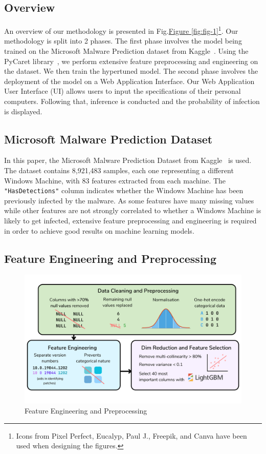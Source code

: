 \documentclass[pdflatex,sn-basic,Numbered]{sn-jnl}%
\theoremstyle{thmstyleone}%
\theoremstyle{thmstyletwo}%
\theoremstyle{thmstylethree}%
\newcommand{\reffig}[1]{\hyperref[#1]{Figure \ref*{#1}}}
\begin{document}
\subsection{Overview}\label{subsec:overview}
An overview of our methodology is presented in Fig.\reffig{fig:fig-1}\footnote[1]{Icons from Pixel Perfect, Eucalyp, Paul J., Freepik, and Canva have been used when designing the figures.}.
Our methodology is split into 2 phases.
The first phase involves the model being trained on the Microsoft Malware Prediction dataset from Kaggle~\cite{microsoft-malware-prediction}.
Using the PyCaret library~\cite{pycaret}, we perform extensive feature preprocessing and engineering on the dataset.
We then train the hypertuned model.
The second phase involves the deployment of the model on a Web Application Interface.
Our Web Application User Interface (UI) allows users to input the specifications of their personal computers.
Following that, inference is conducted and the probability of infection is displayed.

\subsection{Microsoft Malware Prediction Dataset}\label{subsec:microsoft-malware-prediction-dataset}
In this paper, the Microsoft Malware Prediction Dataset from Kaggle~\cite{microsoft-malware-prediction} is used.
The dataset contains 8,921,483 samples, each one representing a different Windows Machine, with 83 features extracted from each machine.
The \texttt{"HasDetections"} column indicates whether the Windows Machine has been previously infected by the malware.
As some features have many missing values while other features are not strongly correlated to whether a Windows Machine is likely to get infected, extensive feature preprocessing and engineering is required in order to achieve good results on machine learning models.

\subsection{Feature Engineering and Preprocessing}\label{subsec:feature-engineering-and-preprocessing}

\begin{figure}[h]
\includegraphics[scale=0.25]{images/feature_engineering}
\centering
\caption{Feature Engineering and Preprocessing}
\label{fig:fig-2}
\end{figure}
\end{document}

